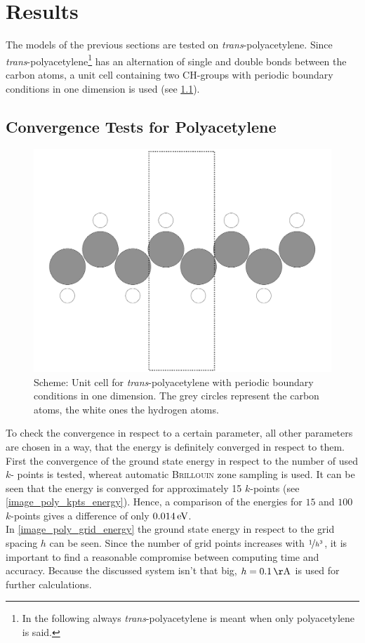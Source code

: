 \chapter{Results}
The models of the previous sections are tested on \emph{trans}-polyacetylene. Since \emph{trans}-polyacetylene\footnote{In the following always \emph{trans}-polyacetylene is meant when only polyacetylene is said.} has an alternation of single and double bonds between the carbon atoms, a unit cell containing two CH-groups with periodic boundary conditions in one dimension is used (see \cref{image_scheme_polyacetylene_unit_cell}). 

\section{Convergence Tests for Polyacetylene}
\begin{figure}[]
	\centering
	\includegraphics[width = .5\textwidth]{Images/polyacetylene/convergence/polyacetylene_nice_unit_cell}
	\caption{Scheme: Unit cell for \emph{trans}-polyacetylene with periodic boundary conditions in one dimension. The grey circles represent the carbon atoms, the white ones the hydrogen atoms.}
	\label{image_scheme_polyacetylene_unit_cell}
\end{figure}
To check the convergence in respect to a certain parameter, all other parameters are chosen in a way, that the energy is definitely converged in respect to them.\\
First the convergence of the ground state energy in respect to the number of used $k$- points is tested, whereat automatic \textsc{Brillouin} zone sampling is used. It can be seen that the energy is converged for approximately 15 $k$-points (see \cref{image_poly_kpts_energy}). Hence, a comparison of the energies for $15$ and $100$ $k$-points gives a difference of only $\unit[0.014]{eV}$.\\
In \cref{image_poly_grid_energy} the ground state energy in respect to the grid spacing $h$ can be seen. Since the number of grid points increases with $\nicefrac{1}{h^3}$, it is important to find a reasonable compromise between computing time and accuracy. Because the discussed system isn't that big, $h = \unit[0.1]{\AA}$ is used for further calculations.\\
